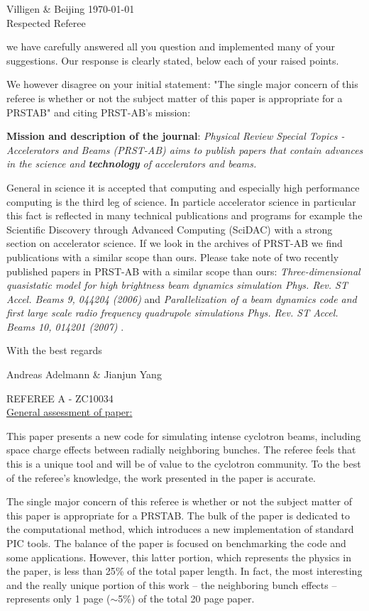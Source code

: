 \documentclass{article}
\begin{document}
Villigen \& Beijing \today \\

Respected Referee

we have carefully answered all you question and implemented many
of your suggestions. Our response is clearly stated, below each of your raised points.

We however disagree on your initial statement: "The single major concern of this referee is whether or not the subject 
matter of this paper is appropriate for a PRSTAB" and citing PRST-AB's mission: 
  
 {\bf Mission and description of the journal}: {\em Physical Review Special Topics - Accelerators and Beams (PRST-AB) aims to publish papers that contain advances in 
the science and {\bf technology} of accelerators and beams. }
 
General in science it is accepted that computing and especially high performance computing is the third leg of science. In particle accelerator science in particular this fact
is reflected in many technical publications and programs for example the Scientific Discovery through Advanced Computing (SciDAC) with a strong section on accelerator science. If we look in the archives of 
PRST-AB we find publications with a similar scope than ours. Please take note of two recently published papers in PRST-AB with a similar scope than ours: 
{\em Three-dimensional quasistatic model for high brightness beam dynamics simulation Phys. Rev. ST Accel. Beams 9, 044204 (2006)} and 
{ \em Parallelization of a beam dynamics code and first large scale radio frequency quadrupole simulations Phys. Rev. ST Accel. Beams 10, 014201 (2007)} .

With the best regards

Andreas Adelmann \& Jianjun Yang
  
\pagebreak  

 REFEREE A - ZC10034 \\


 \underline {General assessment of paper: }
 
 This paper presents a new code for simulating intense cyclotron beams, 
 including space charge effects between radially neighboring bunches. The 
 referee feels that this is a unique tool and will be of value to the 
 cyclotron community. To the best of the referee's knowledge, the work 
 presented in the paper is accurate. 
 
 The single major concern of this referee is whether or not the subject 
 matter of this paper is appropriate for a PRSTAB. The bulk of the paper is 
 dedicated to the computational method, which introduces a new implementation 
 of standard PIC tools. The balance of the paper is focused on benchmarking 
 the code and some applications. However, this latter portion, which 
 represents the physics in the paper, is less than 25{\%} of the total paper 
 length. In fact, the most interesting and the really unique portion of this 
 work -- the neighboring bunch effects -- represents only 1 page ($\sim 
 $5{\%}) of the total 20 page paper. 
 
\end{document}
